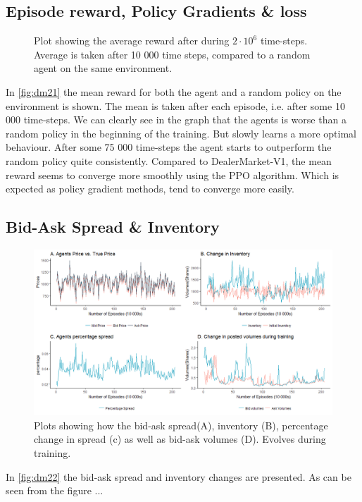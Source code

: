 \documentclass{kththesis}
\theoremstyle{definition}
\begin{document}
\subsection*{Episode reward, Policy Gradients \& loss}
\begin{figure}[H]
	    	\centering
		
		\caption{Plot showing the average reward after  during $2\cdot 10^{6}$ time-steps. Average is taken after 10 000 time steps, compared to a random agent on the same environment.}
		\label{fig:dm21}
\end{figure}
In \autoref{fig:dm21} the mean reward for both the agent and a random policy on the environment is shown. The mean is taken after each episode, i.e. after some 10 000 time-steps. We can clearly see in the graph that the agents is worse than a random policy in the beginning of the training. But slowly learns a more optimal behaviour. After some 75 000 time-steps the agent starts to outperform the random policy quite consistently. Compared to DealerMarket-V1, the mean reward seems to converge more smoothly using the PPO algorithm. Which is expected as policy gradient methods, tend to converge more easily.
\subsection*{Bid-Ask Spread \& Inventory}
\begin{figure}[H]
	    	\centering
		\includegraphics[scale=0.5]{dmv2_basp_inv_multi.png}
		\caption{Plots showing how the bid-ask spread(A), inventory (B), percentage change in spread (c) as well as bid-ask volumes (D). Evolves during training.}
		\label{fig:dm22}
\end{figure}
In \autoref{fig:dm22} the bid-ask spread and inventory changes are presented. As can be seen from the figure ...
\end{document}
